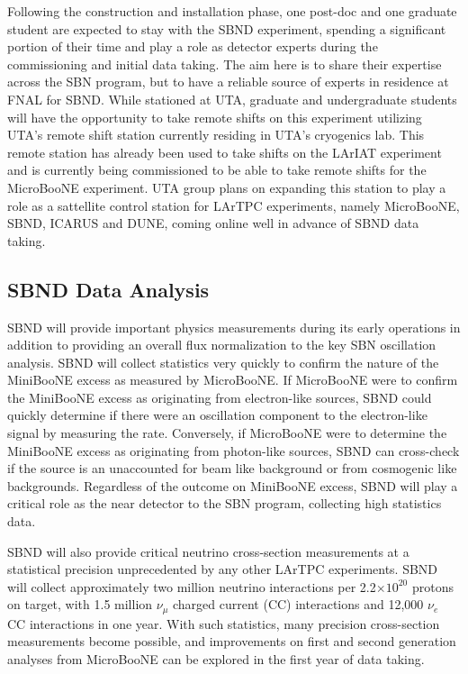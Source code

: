 Following the construction and installation phase, one post-doc and one graduate student are expected to stay with the SBND experiment, spending a significant portion of their time and play a role as detector experts during the commissioning and initial data taking. The aim here is to share their expertise across the SBN program, but to have a reliable source of experts in residence at FNAL for SBND.  While stationed at UTA, graduate and undergraduate students will have the opportunity to take remote shifts on this experiment utilizing UTA's remote shift station currently residing in UTA's cryogenics lab. This remote station has already been used to take shifts on the LArIAT experiment and is currently being commissioned to be able to take remote shifts for the MicroBooNE experiment. UTA group plans on expanding this station to play a role as a sattellite control station for LArTPC experiments, namely MicroBooNE, SBND, ICARUS and DUNE, coming online well in advance of SBND data taking.  

\subsection{SBND Data Analysis}\label{sec:SBNDDataAnalysis}
SBND will provide important physics measurements during its early operations in addition to providing an overall flux normalization to the key SBN oscillation analysis. SBND will collect statistics very quickly to confirm the nature of the MiniBooNE excess as measured by MicroBooNE. If MicroBooNE were to confirm the MiniBooNE excess as originating from electron-like sources, SBND could quickly determine if there were an oscillation component to the electron-like signal by measuring the rate.  Conversely, if MicroBooNE were to determine the MiniBooNE excess as originating from photon-like sources, SBND can cross-check if the source is an unaccounted for beam like background or from cosmogenic like backgrounds. Regardless of the outcome on MiniBooNE excess, SBND will play a critical role as the near detector to the SBN program, collecting high statistics data.

SBND will also provide critical neutrino cross-section measurements at a statistical precision unprecedented by any other LArTPC experiments.  SBND will collect approximately two million neutrino interactions per 2.2$\times 10^{20}$ protons on target, with 1.5 million $\nu_{\mu}$ charged current (CC) interactions and 12,000 $\nu_{e}$ CC interactions in one year. With such statistics, many precision cross-section measurements become possible, and improvements on first and second generation analyses from MicroBooNE can be explored in the first year of data taking.

